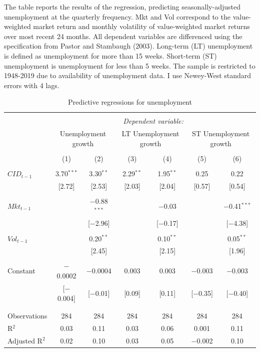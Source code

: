 \documentclass[12pt]{article}
\begin{document}
\begin{table}[!htbp] \centering 
  \caption{Predictive regressions for unemployment} 
  \label{} 
        \begin{flushleft}
    {\medskip\small
 The table reports the results of the regression, predicting seasonally-adjusted unemployment at the quarterly frequency. Mkt and Vol correspond to the value-weighted market return and monthly volatility of value-weighted market returns over most recent 24 months. All dependent variables are differenced using the specification from Pastor and Stambaugh (2003). Long-term (LT) unemployment is defined as unemployment for more than 15 weeks. Short-term (ST) unemployment is unemployment for less than 5 weeks. The sample is restricted to 1948-2019 due to availability of unemployment data. I use Newey-West standard errors with 4 lags.}
    \medskip
    \end{flushleft}
\begin{tabular}{@{\extracolsep{5pt}}lcccccc} 
\\[-1.8ex]\hline 
\hline \\[-1.8ex] 
 & \multicolumn{6}{c}{\textit{Dependent variable:}} \\ 
\cline{2-7} 
 & \multicolumn{2}{c}{Unemployment growth} & \multicolumn{2}{c}{LT Unemployment growth} & \multicolumn{2}{c}{ST Unemployment growth} \\ 
\\[-1.8ex] & (1) & (2) & (3) & (4) & (5) & (6)\\ 
\hline \\[-1.8ex] 
 $CID_{t-1}$ & 3.70$^{***}$ & 3.30$^{**}$ & 2.29$^{**}$ & 1.95$^{**}$ & 0.25 & 0.22 \\ 
  & [2.72] & [2.53] & [2.03] & [2.04] & [0.57] & [0.54] \\ 
  & & & & & & \\ 
 $Mkt_{t-1}$ &  & $-$0.88$^{***}$ &  & $-$0.03 &  & $-$0.41$^{***}$ \\ 
  &  & [$-$2.96] &  & [$-$0.17] &  & [$-$4.38] \\ 
  & & & & & & \\ 
 $Vol_{t-1}$ &  & 0.20$^{**}$ &  & 0.10$^{**}$ &  & 0.05$^{**}$ \\ 
  &  & [2.45] &  & [2.15] &  & [1.96] \\ 
  & & & & & & \\ 
 Constant & $-$0.0002 & $-$0.0004 & 0.003 & 0.003 & $-$0.003 & $-$0.003 \\ 
  & [$-$0.004] & [$-$0.01] & [0.09] & [0.11] & [$-$0.35] & [$-$0.40] \\ 
  & & & & & & \\ 
\hline \\[-1.8ex] 
Observations & 284 & 284 & 284 & 284 & 284 & 284 \\ 
R$^{2}$ & 0.03 & 0.11 & 0.03 & 0.06 & 0.001 & 0.11 \\ 
Adjusted R$^{2}$ & 0.02 & 0.10 & 0.03 & 0.05 & $-$0.002 & 0.10 \\ 
 

\end{tabular}
\end{table}
\end{document}

